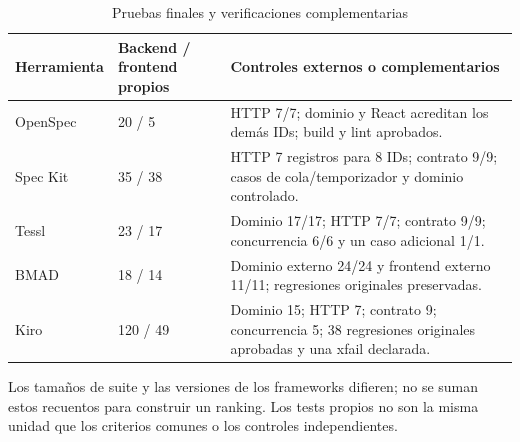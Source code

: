 \begin{table}[H]\centering\small\setlength{\tabcolsep}{4pt}\renewcommand{\arraystretch}{1.06}
\caption{Pruebas finales y verificaciones complementarias}
\label{tab:pruebas_tetris_e2}
\begin{tabularx}{\textwidth}{l Y Y}\toprule

\textbf{Herramienta} & \textbf{Backend / frontend propios} & \textbf{Controles externos o complementarios} \\ \midrule

OpenSpec & 20 / 5 & HTTP 7/7; dominio y React acreditan los demás IDs; build y lint aprobados. \\

Spec Kit & 35 / 38 & HTTP 7 registros para 8 IDs; contrato 9/9; casos de cola/temporizador y dominio controlado. \\

Tessl & 23 / 17 & Dominio 17/17; HTTP 7/7; contrato 9/9; concurrencia 6/6 y un caso adicional 1/1. \\

BMAD & 18 / 14 & Dominio externo 24/24 y frontend externo 11/11; regresiones originales preservadas. \\

Kiro & 120 / 49 & Dominio 15; HTTP 7; contrato 9; concurrencia 5; 38 regresiones originales aprobadas y una xfail declarada. \\

\bottomrule\end{tabularx}

\par\smallskip\begin{minipage}{\textwidth}\footnotesize Los tamaños de suite y las versiones de los frameworks difieren; no se suman estos recuentos para construir un ranking. Los tests propios no son la misma unidad que los criterios comunes o los controles independientes.\end{minipage}

\end{table}

